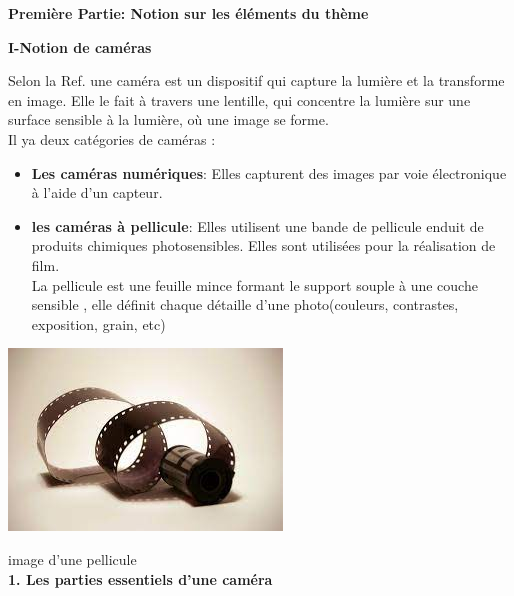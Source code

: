 \documentclass[12pt,a4paper]{report}
\begin{document}
\begin{center}
	\textbf{Première Partie: Notion sur les éléments du thème}
\end{center}



\begin{center}
\textbf{I-Notion de caméras}	
\end{center}

Selon la Ref. \cite{noauthor_quest-ce_nodate} une caméra est un dispositif qui capture la lumière et la transforme en image. Elle le fait à travers une lentille, qui concentre la lumière sur une surface sensible à la lumière, où une image se forme. \\
Il ya deux catégories de caméras :
\begin{itemize}
	\item \textbf{Les caméras numériques}: Elles capturent des images par voie électronique à l’aide d’un capteur.
	\item\textbf{les caméras à pellicule}: Elles utilisent une bande de pellicule enduit de produits chimiques photosensibles. Elles sont utilisées pour la réalisation de film.\\
	La pellicule est une feuille mince formant le support souple à une couche sensible , elle définit chaque détaille d'une photo(couleurs, contrastes, exposition, grain, etc)\\
\end{itemize}

 \includegraphics[scale=1]{image/pellicule.jpeg}
 
      image d'une pellicule\\
      
   \textbf{1. Les parties essentiels d'une caméra\\}
   
\end{document}
